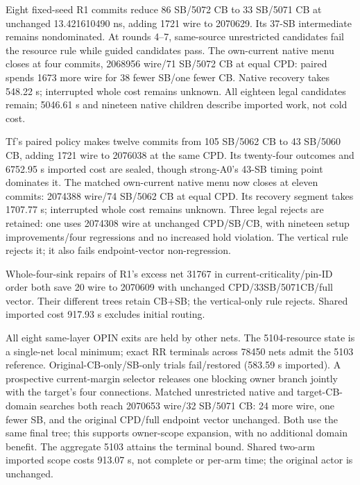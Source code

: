 \documentclass[conference,10pt]{IEEEtran}
\begin{document}
Eight fixed-seed R1 commits reduce 86 SB/5072 CB to 33 SB/5071 CB at unchanged 13.421610490 ns, adding 1721 wire to 2070629. Its 37-SB intermediate remains nondominated. At rounds 4--7, same-source unrestricted candidates fail the resource rule while guided candidates pass. The own-current native menu closes at four commits, 2068956 wire/71 SB/5072 CB at equal CPD: paired spends 1673 more wire for 38 fewer SB/one fewer CB. Native recovery takes 548.22 s; interrupted whole cost remains unknown. All eighteen legal candidates remain; 5046.61 s and nineteen native children describe imported work, not cold cost.

Tf's paired policy makes twelve commits from 105 SB/5062 CB to 43 SB/5060 CB, adding 1721 wire to 2076038 at the same CPD. Its twenty-four outcomes and 6752.95 s imported cost are sealed, though strong-A0's 43-SB timing point dominates it. The matched own-current native menu now closes at eleven commits: 2074388 wire/74 SB/5062 CB at equal CPD. Its recovery segment takes 1707.77 s; interrupted whole cost remains unknown. Three legal rejects are retained: one uses 2074308 wire at unchanged CPD/SB/CB, with nineteen setup improvements/four regressions and no increased hold violation. The vertical rule rejects it; it also fails endpoint-vector non-regression.

Whole-four-sink repairs of R1's excess net 31767 in current-criticality/pin-ID order both save 20 wire to 2070609 with unchanged CPD/33SB/5071CB/full vector. Their different trees retain CB+SB; the vertical-only rule rejects. Shared imported cost 917.93 s excludes initial routing.

All eight same-layer OPIN exits are held by other nets. The 5104-resource state is a single-net local minimum; exact RR terminals across 78450 nets admit the 5103 reference. Original-CB-only/SB-only trials fail/restored (583.59 s imported). A prospective current-margin selector releases one blocking owner branch jointly with the target's four connections. Matched unrestricted native and target-CB-domain searches both reach 2070653 wire/32 SB/5071 CB: 24 more wire, one fewer SB, and the original CPD/full endpoint vector unchanged. Both use the same final tree; this supports owner-scope expansion, with no additional domain benefit. The aggregate 5103 attains the terminal bound. Shared two-arm imported scope costs 913.07 s, not complete or per-arm time; the original actor is unchanged.
\end{document}
